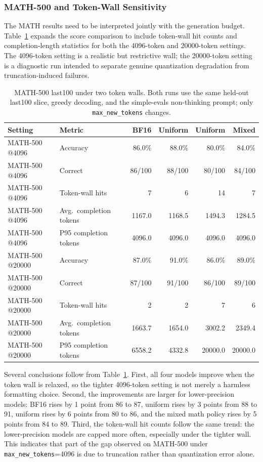 \subsubsection{MATH-500 and Token-Wall Sensitivity}

The MATH results need to be interpreted jointly with the generation budget. Table~\ref{tab:results-math-tokenwall} expands the score comparison to include token-wall hit counts and completion-length statistics for both the 4096-token and 20000-token settings. The 4096-token setting is a realistic but restrictive wall; the 20000-token setting is a diagnostic run intended to separate genuine quantization degradation from truncation-induced failures.

\begin{table}[t]
\centering
\caption{MATH-500 last100 under two token walls. Both runs use the same held-out last100 slice, greedy decoding, and the simple-evals non-thinking prompt; only \texttt{max\_new\_tokens} changes.}
\label{tab:results-math-tokenwall}
\footnotesize
\begin{tabular}{llrrrr}
\toprule
Setting & Metric & BF16 & Uniform \inteight{} & Uniform \intfour{} & Mixed \\
\midrule
MATH-500 @4096 & Accuracy & 86.0\% & 88.0\% & 80.0\% & 84.0\% \\
MATH-500 @4096 & Correct & 86/100 & 88/100 & 80/100 & 84/100 \\
MATH-500 @4096 & Token-wall hits & 7 & 6 & 14 & 7 \\
MATH-500 @4096 & Avg.\ completion tokens & 1167.0 & 1168.5 & 1494.3 & 1284.5 \\
MATH-500 @4096 & P95 completion tokens & 4096.0 & 4096.0 & 4096.0 & 4096.0 \\
\midrule
MATH-500 @20000 & Accuracy & 87.0\% & 91.0\% & 86.0\% & 89.0\% \\
MATH-500 @20000 & Correct & 87/100 & 91/100 & 86/100 & 89/100 \\
MATH-500 @20000 & Token-wall hits & 2 & 2 & 7 & 6 \\
MATH-500 @20000 & Avg.\ completion tokens & 1663.7 & 1654.0 & 3002.2 & 2349.4 \\
MATH-500 @20000 & P95 completion tokens & 6558.2 & 4332.8 & 20000.0 & 20000.0 \\
\bottomrule
\end{tabular}
\end{table}

Several conclusions follow from Table~\ref{tab:results-math-tokenwall}. First, all four models improve when the token wall is relaxed, so the tighter 4096-token setting is not merely a harmless formatting choice. Second, the improvements are larger for lower-precision models: BF16 rises by 1 point from 86 to 87, uniform \inteight{} rises by 3 points from 88 to 91, uniform \intfour{} rises by 6 points from 80 to 86, and the mixed math policy rises by 5 points from 84 to 89. Third, the token-wall hit counts follow the same trend: the lower-precision models are capped more often, especially under the tighter wall. This indicates that part of the gap observed on MATH-500 under \texttt{max\_new\_tokens}=4096 is due to truncation rather than quantization error alone.

